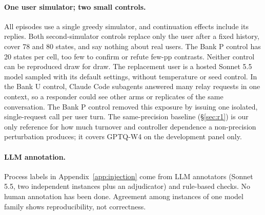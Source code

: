 \paragraph{One user simulator; two small controls.} All \tautwo{} episodes use a single greedy simulator, and continuation effects include its replies. Both second-simulator controls replace only the user after a fixed history, cover 78 and 80 states, and say nothing about real users. The Bank P control has 20 states per cell, too few to confirm or refute few-pp contrasts. %
Neither control can be reproduced draw for draw. The replacement user is a hosted Sonnet 5.5 model sampled with its default settings, without temperature or seed control. In the Bank U control, Claude Code subagents answered many relay requests in one context, so a responder could see other arms or replicates of the same conversation. The Bank P control removed this exposure by issuing one isolated, single-request call per user turn. %
The same-precision baseline (\S\ref{sec:r1}) is our only reference for how much turnover and controller dependence a non-precision perturbation produces; it covers GPTQ-W4 on the development panel only.

\paragraph{LLM annotation.} Process labels in Appendix~\ref{app:injection} come from LLM annotators (Sonnet 5.5, two independent instances plus an adjudicator) and rule-based checks. No human annotation has been done. Agreement among instances of one model family shows reproducibility, not correctness. %

